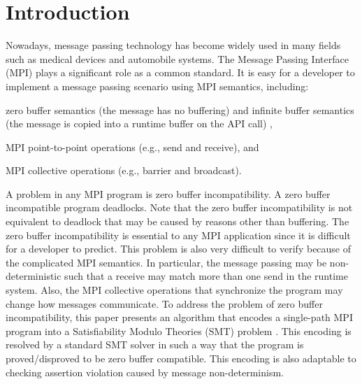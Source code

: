 \section{Introduction}
Nowadays, message passing technology has become widely used in many fields such as medical devices and automobile systems. The Message Passing Interface (MPI) plays a significant role as a common standard. It is easy for a developer to implement a message passing scenario using MPI semantics, including:

\begin{compactitem}
\item zero buffer semantics (the message has no buffering) and infinite buffer semantics (the message is copied into a runtime buffer on the API call) \cite{DBLP:conf/fm/VakkalankaVGK09},
\item MPI point-to-point operations (e.g., send and receive), and
\item MPI collective operations (e.g., barrier and broadcast).
\end{compactitem}

A problem in any MPI program is zero buffer incompatibility. A zero buffer incompatible program deadlocks. Note that the zero buffer incompatibility is not equivalent to deadlock that may be caused by reasons other than buffering. The zero buffer incompatibility is essential to any MPI application since it is difficult for a developer to predict. 
This problem is also very difficult to verify because of the complicated MPI semantics.
In particular, the message passing may be non-deterministic such that a receive may match more than one send in the runtime system. Also, the MPI collective operations that synchronize the program may change how messages communicate. To address the problem of zero buffer incompatibility, this paper presents an algorithm that encodes a single-path MPI program into a Satisfiability Modulo Theories (SMT) problem \cite{barrett2008satisfiability}. This encoding is resolved by a standard SMT solver in such a way that the program is proved/disproved to be zero buffer compatible. This encoding is also adaptable to checking assertion violation caused by message non-determinism.


